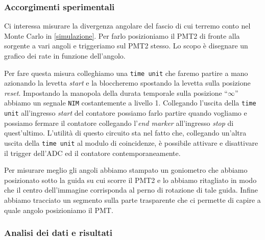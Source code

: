 \subsubsection{Accorgimenti sperimentali}

Ci interessa misurare la divergenza angolare del fascio di cui terremo conto nel Monte Carlo in \autoref{simulazione}.
Per farlo posizioniamo il PMT2 di fronte alla sorgente a vari angoli e triggeriamo sul PMT2 stesso. Lo scopo è disegnare un grafico dei rate in funzione dell'angolo.

Per fare questa misura colleghiamo una \texttt{time unit} che faremo partire a mano azionando la levetta \emph{start} e la bloccheremo spostando la levetta sulla posizione \emph{reset}. Impostando la manopola della durata temporale sulla posizione ``$\infty$'' abbiamo un segnale \texttt{NIM} costantemente a livello 1. Collegando l'uscita della \texttt{time unit} all'ingresso \emph{start} del contatore possiamo farlo partire quando vogliamo e possiamo fermare il contatore collegando l'\emph{end marker} all'ingresso \emph{stop} di quest'ultimo. 
L'utilità di questo circuito sta nel fatto che, collegando un'altra uscita della \texttt{time unit} al modulo di coincidenze, è possibile attivare e disattivare il trigger dell'ADC ed il contatore contemporaneamente.

Per misurare meglio gli angoli abbiamo stampato un goniometro che abbiamo posizionato sotto la guida su cui scorre il PMT2 e lo abbiamo ritagliato in modo che il centro dell'immagine corrisponda al perno di rotazione di tale guida. Infine abbiamo tracciato un segmento sulla parte trasparente che ci permette di capire a quale angolo posizioniamo il PMT.

\subsubsection{Analisi dei dati e risultati}


